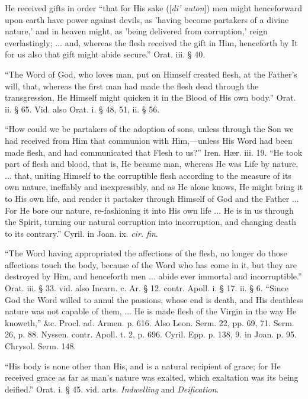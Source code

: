 He
received gifts in order ``that for His sake ([\emph{di}\emph{'
auton}]) men might henceforward upon earth have power against
devils, as 'having become partakers of a divine nature,' and in heaven
might, as 'being delivered from corruption,' reign everlastingly; ...
and, whereas the flesh received the gift in Him, henceforth by It for
us also that gift might abide secure.'' Orat. iii. § 40.

``The
Word of God, who loves man, put on Himself created flesh, at the
Father's will, that, whereas the first man had made the flesh dead
through the transgression, He Himself might quicken it in the Blood of
His own body.'' Orat. ii. § 65. Vid. also Orat. i. § 48, 51, ii. §
56.

``How
could we be partakers of the adoption of sons, unless through the Son
we had received from Him that communion with Him,—unless His Word
had been made flesh, and had communicated that Flesh to us?'' Iren. Hær.
iii. 19. ``He took part of flesh and blood, that is, He became man,
whereas He was Life by nature, ... that, uniting Himself to the
corruptible flesh according to the measure of its own nature,
ineffably and inexpressibly, and as He alone knows, He might bring it
to His own life, and render it partaker through Himself of God and the
Father ... For He bore our nature, re-fashioning it into His own life
... He is in us through the Spirit, turning our natural corruption
into incorruption, and changing death to its contrary.'' Cyril. in
Joan. ix. \emph{cir. fin}.

``The
Word having appropriated the affections of the flesh, no longer do
those affections touch the body, because of the Word who has come in
it, but they are destroyed by Him, and henceforth men ... abide ever
immortal and incorruptible.'' Orat. iii. § 33. vid. also Incarn. c.
Ar. § 12. contr. Apoll. i. § 17. ii. § 6. ``Since God the Word
willed to annul the passions, whose end is death, and His deathless
nature was not capable of them, ... He is made flesh of the Virgin in
the way He knoweth,'' \&c. Procl. ad. Armen. p. 616. Also
Leon. Serm. 22, pp. 69, 71. Serm. 26, p. 88. Nyssen. contr. Apoll. t.
2, p. 696. Cyril. Epp. p. 138, 9. in Joan. p. 95. Chrysol. Serm. 148.

``His
body is none other than His, and is a natural recipient of grace; for
He received grace as far as man's nature was exalted, which exaltation
was its being deified.'' Orat. i. § 45. vid. arts. \emph{Indwelling}
and \emph{Deification}.


